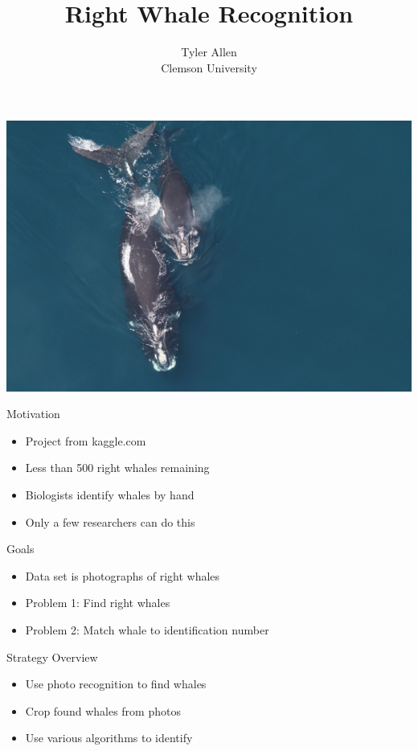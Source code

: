 \documentclass{beamer}
\title[]{Right Whale Recognition}
\author[]{Tyler Allen\\ \footnotesize Clemson University}
\begin{document}
\begin{frame}
\begin{center}
\maketitle
\includegraphics[scale=.5]{title.png}
\end{center}
\end{frame}

\begin{frame}{Motivation}
\begin{itemize}
\item Project from kaggle.com
\item Less than 500 right whales remaining
\item Biologists identify whales by hand
\item Only a few researchers can do this
\end{itemize}
\end{frame}


\begin{frame}{Goals}
\begin{itemize}
\item Data set is photographs of right whales
\item Problem 1: Find right whales
\item Problem 2: Match whale to identification number
\end{itemize}
\end{frame}

\begin{frame}{Strategy Overview}
\begin{itemize}
\item Use photo recognition to find whales
\item Crop found whales from photos
\item Use various algorithms to identify
\end{itemize}
\end{frame}
\end{document}
